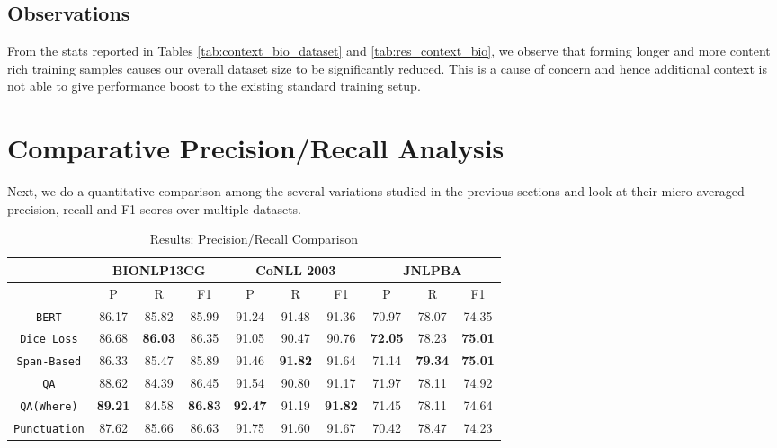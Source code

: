\subsection{Observations}
From the stats reported in Tables \ref{tab:context_bio_dataset} and \ref{tab:res_context_bio}, we observe that forming longer and more content rich training samples causes our overall dataset size to be significantly reduced. This is a cause of concern and hence additional context is not able to give performance boost to the existing standard training setup.

\section{Comparative Precision/Recall Analysis}
\label{sec:precision_recall_analysis}
Next, we do a quantitative comparison among the several variations studied in the previous sections and look at their micro-averaged precision, recall and F1-scores over multiple datasets.

\begin{table}[h!]
\centering
\begin{tabular}{|c|c|c|c|c|c|c|c|c|c|}\hline
     & \multicolumn{3}{c|}{\textbf{BIONLP13CG}} & \multicolumn{3}{c|}{\textbf{CoNLL 2003}} & \multicolumn{3}{c|}{\textbf{JNLPBA}}\\\hline
	 & P & R & F1 & P & R & F1 & P & R & F1\\\hline
	\texttt{BERT} & 86.17 & 85.82 & 85.99 & 91.24 & 91.48 & 91.36 & 70.97 & 78.07 & 74.35\\\hline
	\texttt{Dice Loss} & 86.68 & \textbf{86.03} & 86.35 & 91.05 & 90.47 & 90.76 & \textbf{72.05} & 78.23 & \textbf{75.01}\\\hline
	\texttt{Span-Based} & 86.33 & 85.47 & 85.89 & 91.46 & \textbf{91.82} & 91.64 & 71.14 & \textbf{79.34} & \textbf{75.01}\\\hline
	\texttt{QA} & 88.62 & 84.39 & 86.45 & 91.54 & 90.80 & 91.17 & 71.97 & 78.11 & 74.92\\\hline
	\texttt{QA(Where)} & \textbf{89.21} & 84.58 & \textbf{86.83} & \textbf{92.47} & 91.19 & \textbf{91.82} & 71.45 & 78.11 & 74.64\\\hline
	\texttt{Punctuation} & 87.62 & 85.66 & 86.63 & 91.75 & 91.60 & 91.67 & 70.42 & 78.47 & 74.23\\\hline
	\end{tabular}
    \caption{Results: Precision/Recall Comparison}
    \label{tab:res_precision_recall}
\end{table}


